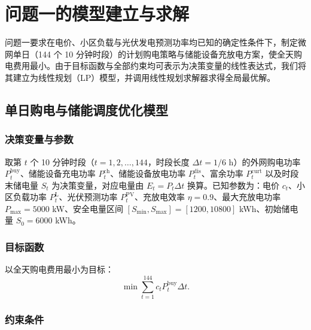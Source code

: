 \documentclass[withoutpreface,bwprint]{cumcmthesis}
\begin{document}

\section{问题一的模型建立与求解}

问题一要求在电价、小区负载与光伏发电预测功率均已知的确定性条件下，制定微网单日（144 个 10 分钟时段）的计划购电策略与储能设备充放电方案，使全天购电费用最小。由于目标函数与全部约束均可表示为决策变量的线性表达式，我们将其建立为线性规划（LP）模型，并调用线性规划求解器求得全局最优解。

\subsection{单日购电与储能调度优化模型}

\subsubsection{决策变量与参数}

取第 $t$ 个 10 分钟时段（$t=1,2,\dots,144$，时段长度 $\Delta t=1/6$ h）的外网购电功率 $P^{\mathrm{buy}}_t$、储能设备充电功率 $P^{\mathrm{ch}}_t$、储能设备放电功率 $P^{\mathrm{dis}}_t$、富余功率 $P^{\mathrm{curt}}_t$ 以及时段末储电量 $S_t$ 为决策变量，对应电量由 $E_t=P_t\Delta t$ 换算。已知参数为：电价 $c_t$、小区负载功率 $P^{\mathrm{L}}_t$、光伏预测功率 $P^{\mathrm{PV}}_t$、充放电效率 $\eta=0.9$、最大充放电功率 $P_{\max}=5000$ kW、安全电量区间 $[S_{\min},S_{\max}]=[1200,10800]$ kWh、初始储电量 $S_0=6000$ kWh。

\subsubsection{目标函数}

以全天购电费用最小为目标：
\begin{equation}
	\min \sum_{t=1}^{144} c_t P^{\mathrm{buy}}_t \Delta t.
	\label{eq:q1obj}
\end{equation}

\subsubsection{约束条件}
\end{document}
